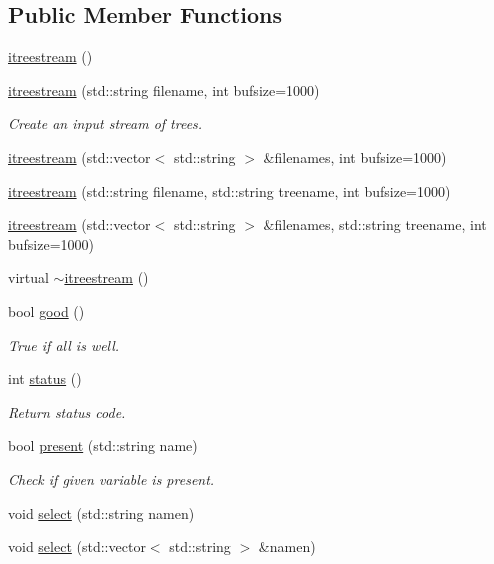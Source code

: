 \subsection*{Public Member Functions}
\begin{CompactItemize}
\item 
\hyperlink{classitreestream_a0}{itreestream} ()
\item 
\hyperlink{classitreestream_a1}{itreestream} (std::string filename, int bufsize=1000)
\begin{CompactList}\small\item\em Create an input stream of trees. \item\end{CompactList}\item 
\hyperlink{classitreestream_a2}{itreestream} (std::vector$<$ std::string $>$ \&filenames, int bufsize=1000)
\item 
\hyperlink{classitreestream_a3}{itreestream} (std::string filename, std::string treename, int bufsize=1000)
\item 
\hyperlink{classitreestream_a4}{itreestream} (std::vector$<$ std::string $>$ \&filenames, std::string treename, int bufsize=1000)
\item 
virtual \hyperlink{classitreestream_a5}{$\sim$itreestream} ()
\item 
bool \hyperlink{classitreestream_a6}{good} ()
\begin{CompactList}\small\item\em True if all is well. \item\end{CompactList}\item 
int \hyperlink{classitreestream_a7}{status} ()
\begin{CompactList}\small\item\em Return status code. \item\end{CompactList}\item 
bool \hyperlink{classitreestream_a8}{present} (std::string name)
\begin{CompactList}\small\item\em Check if given variable is present. \item\end{CompactList}\item 
void \hyperlink{classitreestream_a9}{select} (std::string namen)
\item 
void \hyperlink{classitreestream_a10}{select} (std::vector$<$ std::string $>$ \&namen)

\end{CompactItemize}
